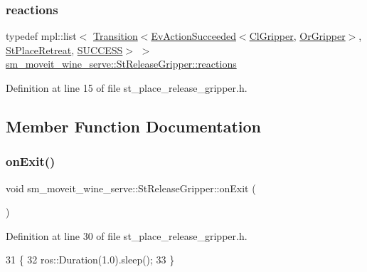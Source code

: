 \subsubsection{\texorpdfstring{reactions}{reactions}}
{\footnotesize\ttfamily typedef mpl\+::list$<$ \hyperlink{classsmacc_1_1Transition}{Transition}$<$\hyperlink{structsmacc_1_1default__events_1_1EvActionSucceeded}{Ev\+Action\+Succeeded}$<$\hyperlink{classsm__moveit__wine__serve_1_1cl__gripper_1_1ClGripper}{Cl\+Gripper}, \hyperlink{classsm__moveit__wine__serve_1_1OrGripper}{Or\+Gripper}$>$, \hyperlink{structsm__moveit__wine__serve_1_1StPlaceRetreat}{St\+Place\+Retreat}, \hyperlink{structsmacc_1_1default__transition__tags_1_1SUCCESS}{S\+U\+C\+C\+E\+SS}$>$ $>$ \hyperlink{structsm__moveit__wine__serve_1_1StReleaseGripper_a1507f23cfddea7bb85865c7f1027ac7b}{sm\+\_\+moveit\+\_\+wine\+\_\+serve\+::\+St\+Release\+Gripper\+::reactions}}



Definition at line 15 of file st\+\_\+place\+\_\+release\+\_\+gripper.\+h.



\subsection{Member Function Documentation}
\mbox{\label{structsm__moveit__wine__serve_1_1StReleaseGripper_af1316527c0060146d68fe05ea64487b3}} 
\subsubsection{\texorpdfstring{on\+Exit()}{onExit()}}
{\footnotesize\ttfamily void sm\+\_\+moveit\+\_\+wine\+\_\+serve\+::\+St\+Release\+Gripper\+::on\+Exit (\begin{DoxyParamCaption}{ }\end{DoxyParamCaption})\hspace{0.3cm}{\ttfamily [inline]}}



Definition at line 30 of file st\+\_\+place\+\_\+release\+\_\+gripper.\+h.


\begin{DoxyCode}
31         \{
32             ros::Duration(1.0).sleep();
33         \}
\end{DoxyCode}
\mbox{\label{structsm__moveit__wine__serve_1_1StReleaseGripper_a48e920f5cb800410c4f7e68a0106d71d}} 
